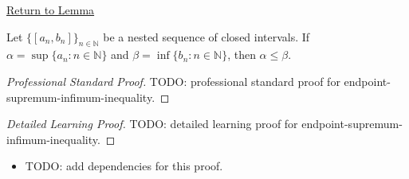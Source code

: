 \newpage
{}
\label{prf:endpoint-supremum-infimum-inequality}

\begin{remark*}[Return]
\hyperref[lem:endpoint-supremum-infimum-inequality]{Return to Lemma}
\end{remark*}

\begin{lemma*}
Let $\{[a_n,b_n]\}_{n\in\mathbb N}$ be a nested sequence of closed intervals.
If $\alpha=\sup\{a_n:n\in\mathbb N\}$ and
$\beta=\inf\{b_n:n\in\mathbb N\}$, then $\alpha\le \beta$.
\end{lemma*}

\begin{proof}[Professional Standard Proof]
\LRAProofBodyStart
TODO: professional standard proof for endpoint-supremum-infimum-inequality.
\end{proof}

\begin{proof}[Detailed Learning Proof]
\LRAProofBodyStart
TODO: detailed learning proof for endpoint-supremum-infimum-inequality.
\end{proof}

\begin{remark*}
\end{remark*}

\begin{dependencies}
\begin{itemize}
  \item TODO: add dependencies for this proof.
\end{itemize}
\end{dependencies}

\clearpage
